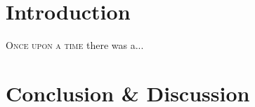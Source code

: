 \section{Introduction}
\lettrine{O}{\fontsize{14}\fscshape{}\selectfont{}nce upon a time} there was a...


\section{}


\section{Conclusion \& Discussion}

